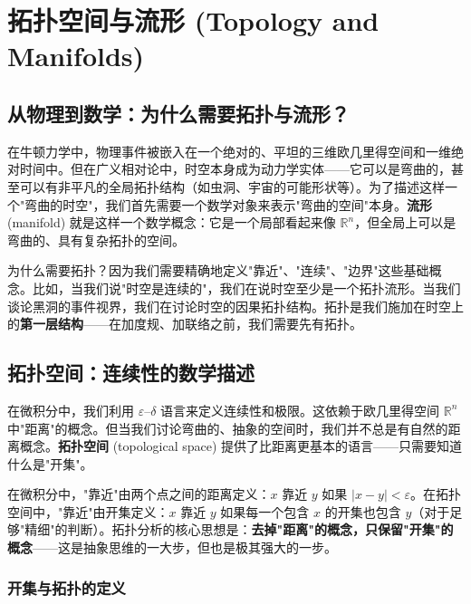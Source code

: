 \chapter{拓扑空间与流形 (Topology and Manifolds)}
\label{chap:manifold}

\section{从物理到数学：为什么需要拓扑与流形？}

\begin{note}[物理动机]
在牛顿力学中，物理事件被嵌入在一个绝对的、平坦的三维欧几里得空间和一维绝对时间中。但在广义相对论中，时空本身成为动力学实体——它可以是弯曲的，甚至可以有非平凡的全局拓扑结构（如虫洞、宇宙的可能形状等）。为了描述这样一个"弯曲的时空"，我们首先需要一个数学对象来表示"弯曲的空间"本身。\textbf{流形} (manifold) 就是这样一个数学概念：它是一个局部看起来像 $\mathbb{R}^n$，但全局上可以是弯曲的、具有复杂拓扑的空间。

为什么需要拓扑？因为我们需要精确地定义"靠近"、"连续"、"边界"这些基础概念。比如，当我们说"时空是连续的"，我们在说时空至少是一个拓扑流形。当我们谈论黑洞的事件视界，我们在讨论时空的因果拓扑结构。拓扑是我们施加在时空上的\textbf{第一层结构}——在加度规、加联络之前，我们需要先有拓扑。
\end{note}

\section{拓扑空间：连续性的数学描述}

在微积分中，我们利用 $\varepsilon$--$\delta$ 语言来定义连续性和极限。这依赖于欧几里得空间 $\mathbb{R}^n$ 中"距离"的概念。但当我们讨论弯曲的、抽象的空间时，我们并不总是有自然的距离概念。\textbf{拓扑空间} (topological space) 提供了比距离更基本的语言——只需要知道什么是"开集"。

\begin{remark}[思维方式的转变]
在微积分中，"靠近"由两个点之间的距离定义：$x$ 靠近 $y$ 如果 $|x-y| < \varepsilon$。在拓扑空间中，"靠近"由开集定义：$x$ 靠近 $y$ 如果每一个包含 $x$ 的开集也包含 $y$（对于足够"精细"的判断）。拓扑分析的核心思想是：\textbf{去掉"距离"的概念，只保留"开集"的概念}——这是抽象思维的一大步，但也是极其强大的一步。
\end{remark}

\subsection{开集与拓扑的定义}

